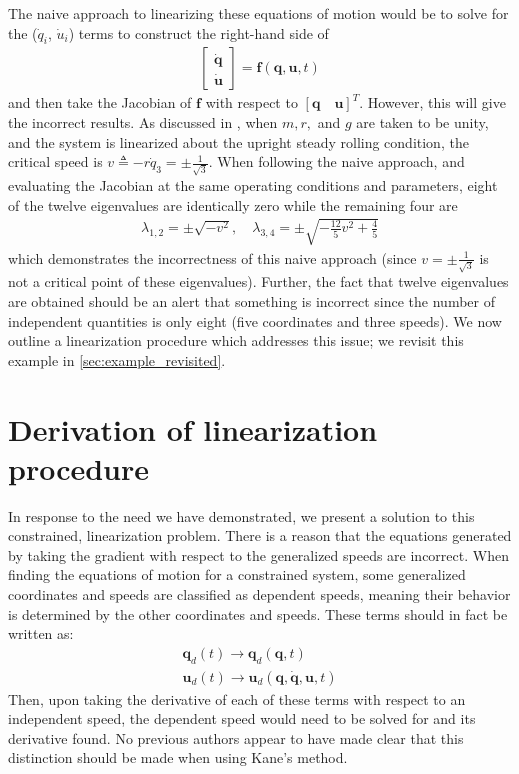 \documentclass[smallcondensed,final]{svjour3}                     %
\begin{document}
The naive approach to linearizing these equations of motion would be to solve
for the ($\dot{q}_i$, $\dot{u}_i$) terms to construct the right-hand side of
\begin{align}
\begin{bmatrix}\dot{\mathbf{q}} \\ \dot{\mathbf{u}}\end{bmatrix} =
    \mathbf{f}(\mathbf{q}, \mathbf{u}, t)
\end{align}
and then take the Jacobian of $\mathbf{f}$ with respect to $[\mathbf{q} \quad
\mathbf{u}]^T$. However, this will give the incorrect results. As discussed in
\cite{Schwab2003}, when $m, r,$ and $g$ are taken to be unity, and the system
is linearized about the upright steady rolling condition, the critical speed is
$v \triangleq -r\dot{q}_3 =\pm\frac{1}{\sqrt{3}}$. When following the naive approach, and
evaluating the Jacobian at the same operating conditions and parameters, eight
of the twelve eigenvalues are identically zero while the remaining four are
\begin{align}
  \lambda_{1,2}=\pm\sqrt{-v^2},\quad \lambda_{3,4} = \pm\sqrt{-\frac{12}{5} v^2 + \frac{4}{5}}
\end{align}
which demonstrates the incorrectness of this naive approach (since
$v=\pm\frac{1}{\sqrt{3}}$ is not a critical point of these eigenvalues).
Further, the fact that twelve eigenvalues are obtained should be an alert that
something is incorrect since the number of independent quantities is only eight
(five coordinates and three speeds). We now outline a linearization procedure
which addresses this issue; we revisit this example in
\ref{sec:example_revisited}.

\section{Derivation of linearization procedure}
\label{sec:derivations}

In response to the need we have demonstrated, we present a solution to this
constrained, linearization problem.
There is a reason that the equations generated by taking the gradient with
respect to the generalized speeds are incorrect.
When finding the equations of motion for a constrained system, some generalized
coordinates and speeds are classified as dependent speeds, meaning their
behavior is determined by the other coordinates and speeds.
These terms should in fact be written as:
\begin{align}
\label{eq:q_d_redefined}
\mathbf{q}_d (t) \to \mathbf{q}_d (\mathbf{q}, t) \\
\label{eq:u_d_redefined}
\mathbf{u}_d (t) \to \mathbf{u}_d (\mathbf{q}, \dot{\mathbf{q}}, \mathbf{u}, t)
\end{align}
Then, upon taking the derivative of each of these terms with respect to an
independent speed, the dependent speed would need to be solved for and its
derivative found.
No previous authors appear to have made clear that this distinction should be
made when using Kane's method.
\end{document}
